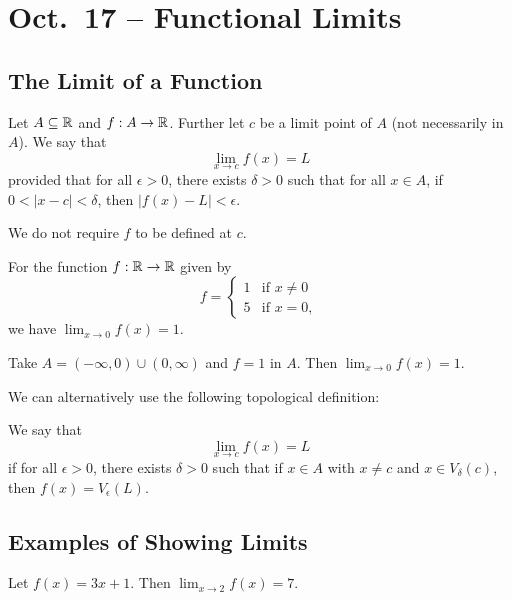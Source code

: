 \chapter{Oct.~17 -- Functional Limits}

\section{The Limit of a Function}
\begin{definition}
  Let $A \subseteq \mathbb{R}$ and $f : A \to \mathbb{R}$. Further let
  $c$ be a limit point of $A$ (not necessarily in $A$).
  We say that
  \[\lim_{x \to c} f(x) = L\]
  provided that for all $\epsilon > 0$, there exists
  $\delta > 0$ such that for all $x \in A$, if
  $0 < |x - c| < \delta$, then
  $|f(x) - L| < \epsilon$.
\end{definition}

\begin{remark}
  We do not require $f$ to be defined at $c$.
\end{remark}

\begin{example}
  For the function $f : \mathbb{R} \to \mathbb{R}$ given by
  \[
    f = \begin{cases}
      1 & \text{if $x \ne 0$} \\
      5 & \text{if $x = 0$},
    \end{cases}
  \]
  we have $\lim_{x \to 0} f(x) = 1$.
\end{example}

\begin{example}
  Take $A = (-\infty, 0) \cup (0, \infty)$ and $f = 1$
  in $A$. Then $\lim_{x \to 0} f(x) = 1$.
\end{example}

We can alternatively use the following topological
definition:
\begin{definition}
  We say that
  \[\lim_{x \to c}f(x) = L\]
  if for all $\epsilon > 0$, there exists $\delta > 0$
  such that if $x \in A$ with $x \ne c$ and
  $x \in V_\delta(c)$, then $f(x) = V_\epsilon(L)$.
\end{definition}

\section{Examples of Showing Limits}
\begin{exercise}
  Let $f(x) = 3x + 1$. Then $\lim_{x \to 2} f(x) = 7$.
\end{exercise}

